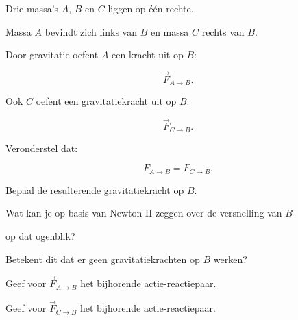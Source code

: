 \documentclass{ximera}
\begin{document}


\begin{oefening}{\oefG}

Drie massa's $A$, $B$ en $C$ liggen op één rechte.

Massa $A$ bevindt zich links van $B$ en massa $C$ rechts van $B$.

Door gravitatie oefent $A$ een kracht uit op $B$:

\[\vec F_{A\rightarrow B}.\]

Ook $C$ oefent een gravitatiekracht uit op $B$:

\[\vec F_{C\rightarrow B}.\]

Veronderstel dat:

\[F_{A\rightarrow B} = F_{C\rightarrow B}.\]

\begin{question}

Bepaal de resulterende gravitatiekracht op $B$.

\end{question}

\begin{question}

Wat kan je op basis van Newton II zeggen over de versnelling van $B$

op dat ogenblik?

\end{question}

\begin{question}

Betekent dit dat er geen gravitatiekrachten op $B$ werken?

\end{question}

\begin{question}

Geef voor $\vec F_{A\rightarrow B}$ het bijhorende actie-reactiepaar.

\end{question}

\begin{question}

Geef voor $\vec F_{C\rightarrow B}$ het bijhorende actie-reactiepaar.

\end{question}


\begin{oplossing}


\end{oplossing}
\end{oefening}
\end{document}
